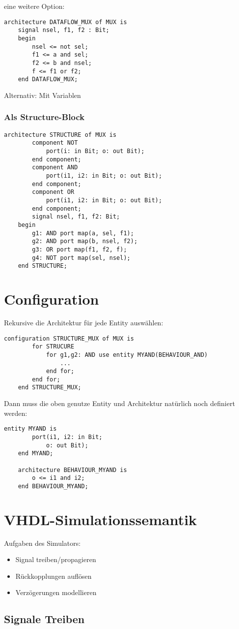 eine weitere Option:
\begin{lstlisting}[style=vhdl]
    architecture DATAFLOW_MUX of MUX is
    signal nsel, f1, f2 : Bit;
    begin
        nsel <= not sel;
        f1 <= a and sel;
        f2 <= b and nsel;
        f <= f1 or f2;
    end DATAFLOW_MUX;
\end{lstlisting}
Alternativ: Mit Variablen

\subsubsection{Als Structure-Block}
\begin{lstlisting}[style=vhdl]
    architecture STRUCTURE of MUX is
        component NOT
            port(i: in Bit; o: out Bit);
        end component;
        component AND
            port(i1, i2: in Bit; o: out Bit);
        end component;
        component OR
            port(i1, i2: in Bit; o: out Bit);
        end component;
        signal nsel, f1, f2: Bit;
    begin
        g1: AND port map(a, sel, f1);
        g2: AND port map(b, nsel, f2);
        g3: OR port map(f1, f2, f);
        g4: NOT port map(sel, nsel);
    end STRUCTURE;
\end{lstlisting}

\section{Configuration}
Rekursive die Architektur für jede Entity auswählen:
\begin{lstlisting}[style=vhdl]
    configuration STRUCTURE_MUX of MUX is
        for STRUCURE
            for g1,g2: AND use entity MYAND(BEHAVIOUR_AND)
                ...
            end for;
        end for;
    end STRUCTURE_MUX;
\end{lstlisting}

Dann muss die oben genutze Entity und Architektur natürlich noch definiert werden:
\begin{lstlisting}[style=vhdl]
    entity MYAND is
        port(i1, i2: in Bit; 
            o: out Bit);
    end MYAND;

    architecture BEHAVIOUR_MYAND is
        o <= i1 and i2;
    end BEHAVIOUR_MYAND;
\end{lstlisting}

\section{VHDL-Simulationssemantik}
Aufgaben des Simulators:
\begin{itemize}
    \item Signal treiben/propagieren
    \item Rückkopplungen auflösen
    \item Verzögerungen modellieren
\end{itemize}

\subsection{Signale Treiben}
